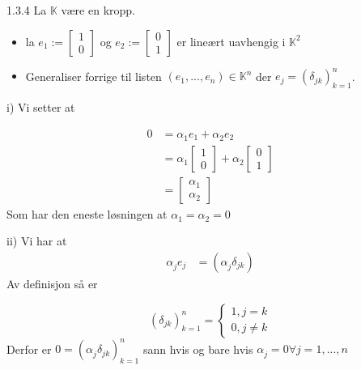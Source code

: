 \documentclass[a4paper,norsk]{article}
\begin{document}
\begin{oppgavebox}{1.3.4}{}
La $ \mathbb{K} $ være en kropp. 
\begin{itemize}
    \item la $ e_1 := \begin{bmatrix}
        1\\
        0
    \end{bmatrix}  $  og $ e_2 := \begin{bmatrix}
        0\\
        1
    \end{bmatrix}  $ er lineært uavhengig i $ \mathbb{K}^2 $ 
    \item Generaliser forrige til listen $ \left( e_1, ..., e_n \right) \in \mathbb{K}^n  $ der $ e_j = \left( \delta_{jk} \right)_{k=1}^n  $.
\end{itemize} 

\begin{proofbox}{i)}{}
Vi setter at

\begin{align*}
    0 &= \alpha_{1}^{} e_1 + \alpha_{2}^{} e_2\\
    &= \alpha_{1}^{} \begin{bmatrix}
        1\\0
    \end{bmatrix} + \alpha_{2}^{} \begin{bmatrix}
        0\\1
    \end{bmatrix} \\
    &= \begin{bmatrix}
        \alpha_{1}^{} \\ \alpha_{2}^{} 
    \end{bmatrix} 
\end{align*}
Som har den eneste løsningen at $ \alpha_{1}^{} = \alpha_{2}^{} =0 $ 
\end{proofbox}

\begin{proofbox}{ii)}{}
Vi har at
\begin{align*}
    \alpha_{j}^{} e_j &= \left( \alpha_{j}^{} \delta_{jk} \right) 
\end{align*}
Av definisjon så er 

\[
    \left( \delta_{jk} \right) _{k=1}^n = \begin{cases}
        1, j=k\\
        0, j \neq k
    \end{cases}
\]
Derfor er $ 0 = \left( \alpha_{j}^{} \delta_{jk} \right)_{k=1}^n  $ sann hvis og bare hvis $ \alpha_{j}^{} =0 \forall j = 1, ..., n $ 
\end{proofbox}
\end{oppgavebox}
\end{document}
